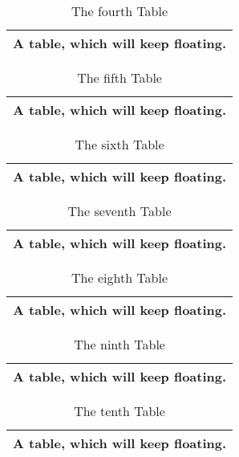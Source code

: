 \documentclass[british]{article}
\begin{document}
\begin{table}[t] \centering%
\begin{tabular}{|l|}
\hline
A table, which will keep floating.\\ \hline
\end{tabular}%
\caption{The fourth Table}%
\end{table}%

\begin{table}[t] \centering%
\begin{tabular}{|l|}
\hline
A table, which will keep floating.\\ \hline
\end{tabular}%
\caption{The fifth Table}%
\end{table}%

\begin{table}[t] \centering%
\begin{tabular}{|l|}
\hline
A table, which will keep floating.\\ \hline
\end{tabular}%
\caption{The sixth Table}%
\end{table}%

\begin{table}[t] \centering%
\begin{tabular}{|l|}
\hline
A table, which will keep floating.\\ \hline
\end{tabular}%
\caption{The seventh Table}%
\end{table}%

\begin{table}[t] \centering%
\begin{tabular}{|l|}
\hline
A table, which will keep floating.\\ \hline
\end{tabular}%
\caption{The eighth Table}%
\end{table}%

\begin{table}[t] \centering%
\begin{tabular}{|l|}
\hline
A table, which will keep floating.\\ \hline
\end{tabular}%
\caption{The ninth Table}%
\end{table}%

\begin{table}[t] \centering%
\begin{tabular}{|l|}
\hline
A table, which will keep floating.\\ \hline
\end{tabular}%
\caption{The tenth Table}%
\end{table}%
\end{document}
